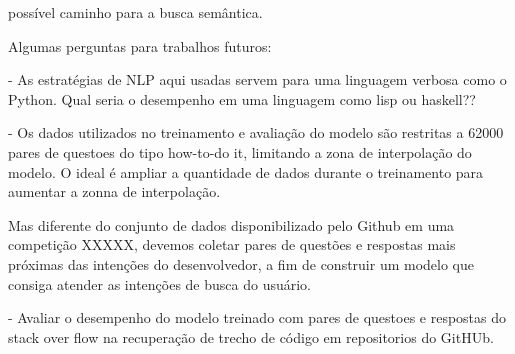 possível caminho para a busca semântica.

Algumas perguntas para trabalhos futuros:

 - As estratégias de NLP aqui usadas servem para uma linguagem verbosa como o Python. Qual seria o desempenho em uma linguagem como lisp ou haskell??
 
 - Os dados utilizados no treinamento e avaliação do modelo são restritas a 62000 pares de questoes do tipo how-to-do it, limitando a zona de interpolação do modelo. O ideal é ampliar a quantidade de dados durante o treinamento para aumentar a zonna de interpolação. 
 
 
 Mas diferente do conjunto de dados disponibilizado pelo Github em uma competição XXXXX, devemos coletar pares de questões e respostas mais próximas das intenções do desenvolvedor, a fim de construir um modelo que consiga atender as intenções de busca do usuário.
 
 - Avaliar o desempenho do modelo treinado com pares de questoes e respostas do stack over flow na recuperação de trecho de código em repositorios do GitHUb. 
